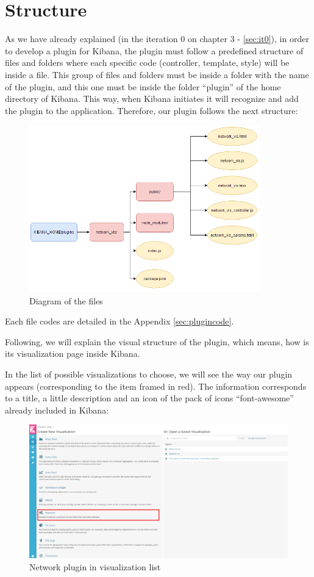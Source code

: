 \documentclass[a4paper, 12pt]{book}
\begin{document}
\section{Structure}


As we have already explained (in the iteration 0 on chapter 3 - \ref{sec:it0}), in order to develop a plugin for Kibana, the plugin must follow a predefined structure of files and folders where each specific code (controller, template, style) will be inside a file. This group of files and folders must be inside a folder with the name of the plugin, and this one must be inside the folder “plugin” of the home directory of Kibana. This way, when Kibana initiates it will recognize and add the plugin to the application. Therefore, our plugin follows the next structure: 

\begin{figure}[H]
  \centering
  \includegraphics[width=10cm, keepaspectratio]{img/results/codediagram2}
  \caption{Diagram of the files}
  \label{fig:codediagram}
\end{figure}

Each file codes are detailed in the Appendix \ref{sec:plugincode}. 

Following, we will explain the visual structure of the plugin, which means, how is its visualization page inside Kibana.

In the list of possible visualizations to choose, we will see the way our plugin appears (corresponding to the item framed in red). The information corresponds to a title, a little description and an icon of the pack of icons “font-awesome” already included in Kibana: 

\begin{figure}[H]
  \centering
  \includegraphics[width=16cm, keepaspectratio]{img/results/lista}
  \caption{Network plugin in visualization list}
  \label{fig:listpluginsresults}
\end{figure}
\end{document}
